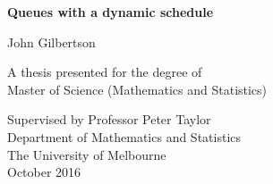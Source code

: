 \begin{titlepage}
    \begin{center}
        \vspace*{1cm}
        
        \Huge
        \textbf{Queues with a dynamic schedule}
        
        \vspace{0.5cm}
        
        \LARGE
        John Gilbertson
        
        \vfill
        
        A thesis presented for the degree of\\
        Master of Science (Mathematics and Statistics)
        
        \vspace{0.8cm}
        
        \Large
        Supervised by Professor Peter Taylor\\
        Department of Mathematics and Statistics\\
        The University of Melbourne\\
        October 2016
        
    \end{center}
\end{titlepage}














































